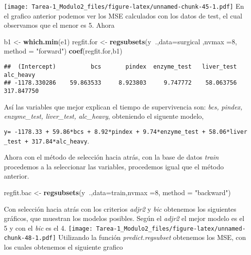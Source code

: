 \documentclass[
]{article}
\newenvironment{Shaded}{\begin{snugshade}}{\end{snugshade}}
\newcommand{\DataTypeTok}[1]{\textcolor[rgb]{0.13,0.29,0.53}{#1}}
\newcommand{\DecValTok}[1]{\textcolor[rgb]{0.00,0.00,0.81}{#1}}
\newcommand{\KeywordTok}[1]{\textcolor[rgb]{0.13,0.29,0.53}{\textbf{#1}}}
\newcommand{\NormalTok}[1]{#1}
\newcommand{\OperatorTok}[1]{\textcolor[rgb]{0.81,0.36,0.00}{\textbf{#1}}}
\newcommand{\StringTok}[1]{\textcolor[rgb]{0.31,0.60,0.02}{#1}}
\begin{document}
\texttt{[image: Tarea-1\_Modulo2\_files/figure-latex/unnamed-chunk-45-1.pdf]}
En el grafico anterior podemos ver los MSE calculados con los datos de
test, el cual observamos que el menor es 5. Ahora

\begin{Shaded}
\begin{Highlighting}[]
\NormalTok{b1 <-}\StringTok{ }\KeywordTok{which.min}\NormalTok{(e1)}
\NormalTok{regfit.for <-}\StringTok{ }\KeywordTok{regsubsets}\NormalTok{(y}\OperatorTok{~}\NormalTok{.,}\DataTypeTok{data=}\NormalTok{surgical ,}\DataTypeTok{nvmax =}\DecValTok{8}\NormalTok{, }\DataTypeTok{method =} \StringTok{"forward"}\NormalTok{)}
\KeywordTok{coef}\NormalTok{(regfit.for,b1)}
\end{Highlighting}
\end{Shaded}

\begin{verbatim}
##  (Intercept)          bcs       pindex  enzyme_test   liver_test    alc_heavy 
## -1178.330286    59.863533     8.923803     9.747772    58.063756   317.847750
\end{verbatim}

Así las variables que mejor explican el tiempo de supervivencia son:
\emph{bcs, pindex, enzyme\_test, liver\_test, alc\_heavy}, obteniendo el
siguente modelo,

\texttt{y=\ -1178.33\ +\ 59.86*bcs\ +\ 8.92*pindex\ +\ 9.74*enzyme\_test\ +\ 58.06*liver\_test\ +\ 317.84*alc\_heavy}.

Ahora con el método de selección hacia atrás, con la base de datos
\emph{train} procedemos a la seleccionar las variables, procedemos igual
que el método anterior.

\begin{Shaded}
\begin{Highlighting}[]
\NormalTok{regfit.bac <-}\StringTok{ }\KeywordTok{regsubsets}\NormalTok{(y}\OperatorTok{~}\NormalTok{.,}\DataTypeTok{data=}\NormalTok{train,}\DataTypeTok{nvmax =}\DecValTok{8}\NormalTok{, }\DataTypeTok{method =} \StringTok{"backward"}\NormalTok{)}
\end{Highlighting}
\end{Shaded}

Con selección hacia atrás con los criterios \emph{adjr2} y \emph{bic}
obtenemos los siguientes gráficos, que muestran los modelos posibles.
Según el \emph{adjr2} el mejor modelo es el 5 y con el \emph{bic} es el
4.
\texttt{[image: Tarea-1\_Modulo2\_files/figure-latex/unnamed-chunk-48-1.pdf]}
Utilizando la función \emph{predict.regsubset} obtenemos los MSE, con
los cuales obtenemos el siguiente grafico
\end{document}
